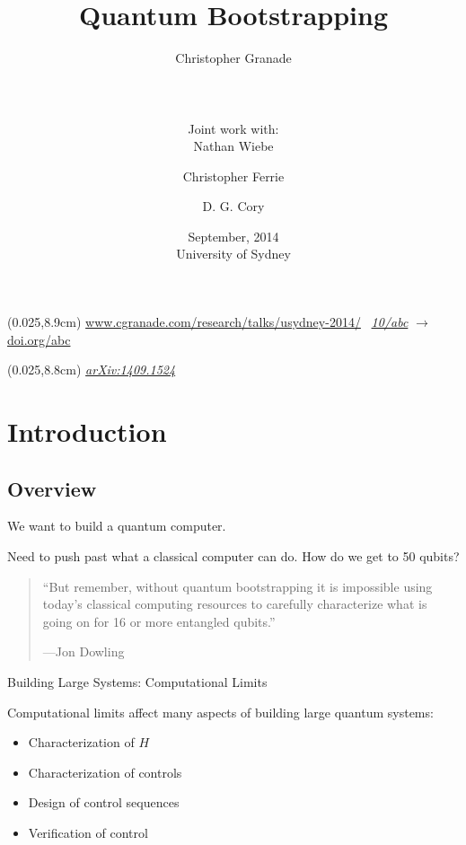 \documentclass[xcolor=dvipsnames, compress]{beamer}
\title{Quantum Bootstrapping}
\author[Granade, Wiebe, Ferrie and Cory]{
  Christopher Granade  \\
  \rule{0.35\textwidth}{0.125pt}\\
  {\footnotesize Joint work with:}\\
  Nathan Wiebe \and
  Christopher Ferrie \and
  D. G. Cory
}
\institute[IQC]{
  Institute for Quantum Computing\\
  {University of Waterloo, Ontario, Canada}
}
\date[September 2014]{
  September, 2014 \\
  {\footnotesize University of Sydney}
}
\renewcommand\UrlFont{\color{red}\rmfamily\itshape}
\newcommand{\shortdoi}[1]{\href{http://doi.org/#1}{\UrlFont 10/#1}}
\newcommand{\bottomnote}[1]{
  \begin{textblock*}{0.95\paperwidth} (0.025\paperwidth,8.9cm)
    {\tiny \hfill #1}
  \end{textblock*}
}
\begin{document}
\begin{frame}[plain]
  \titlepage
  \bottomnote{\url{www.cgranade.com/research/talks/usydney-2014/} \textbullet~\shortdoi{abc} $\to$ \url{doi.org/abc}}

  \begin{textblock*}{0.95\paperwidth} (0.025\paperwidth,8.8cm)
    {\href{https://scirate.com/arxiv/1409.1524}{\UrlFont{arXiv:1409.1524}}}
  \end{textblock*}
\end{frame}

\section{Introduction}
\subsection{Overview}

\begin{frame}
  
  \begin{block}{}
    We want to build a quantum computer.
  \end{block}

  \pause

  Need to push past what a classical computer can do.
  How do we get to 50 qubits?

\end{frame}

\begin{frame}

  \begin{quote}{}
    ``But remember, without quantum bootstrapping it is impossible using today’s classical computing resources to carefully characterize what is going on for 16 or more entangled qubits.''

    \hfill\normalfont---Jon Dowling
  \end{quote}

\end{frame}

\begin{frame}{Building Large Systems: Computational Limits}

  Computational limits affect many aspects of building
  large quantum systems:

  \begin{itemize}[<+->]
    \item Characterization of $H$
    \item Characterization of controls
    \item Design of control sequences
    \item Verification of control
  \end{itemize}


\end{frame}
\end{document}
